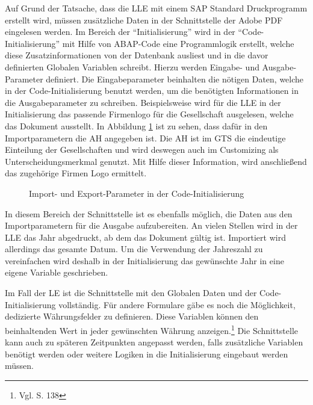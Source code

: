 Auf Grund der Tatsache, dass die \ac{LLE} mit einem SAP Standard Druckprogramm erstellt wird, müssen zusätzliche Daten in der Schnittstelle der Adobe \ac{PDF} eingelesen werden. Im Bereich der "`Initialisierung"' wird in der "`Code-Initialisierung"' mit Hilfe von \ac{ABAP}-Code eine Programmlogik erstellt, welche diese Zusatzinformationen von der Datenbank ausliest und in die davor definierten Globalen Variablen schreibt. Hierzu werden Eingabe- und Ausgabe-Parameter definiert. Die Eingabeparameter beinhalten die nötigen Daten, welche in der Code-Initialisierung benutzt werden, um die benötigten Informationen in die Ausgabeparameter zu schreiben. Beispielsweise wird für die \ac{LLE} in der Initialisierung das passende Firmenlogo für die Gesellschaft ausgelesen, welche das Dokument ausstellt. In Abbildung \ref{figCo} ist zu sehen, dass dafür in den Importparametern die \ac{AH} angegeben ist. Die \ac{AH} ist im GTS die eindeutige Einteilung der Gesellschaften und wird deswegen auch im Customizing als Unterscheidungsmerkmal genutzt. Mit Hilfe dieser Information, wird anschließend das zugehörige Firmen Logo ermittelt.

\begin{figure}[ht]
	\centering
	\caption{Import- und Export-Parameter in der Code-Initialisierung}
	\label{figCo}
\end{figure}

In diesem Bereich der Schnittstelle ist es ebenfalls möglich, die Daten aus den Importparametern für die Ausgabe aufzubereiten. An vielen Stellen wird in der \ac{LLE} das Jahr abgedruckt, ab dem das Dokument gültig ist. Importiert wird allerdings das gesamte Datum. Um die Verwendung der Jahreszahl zu vereinfachen wird deshalb in der Initialisierung das gewünschte Jahr in eine eigene Variable geschrieben.

Im Fall der \ac{LE} ist die Schnittstelle mit den Globalen Daten und der Code-Initialisierung vollständig. Für andere Formulare gäbe es noch die Möglichkeit, dedizierte Währungsfelder zu definieren. Diese Variablen können den beinhaltenden Wert in jeder gewünschten Währung anzeigen.\footnote{Vgl. \cite{Hauser.2015} S. 138}
Die Schnittstelle kann auch zu späteren Zeitpunkten angepasst werden, falls zusätzliche Variablen benötigt werden oder weitere Logiken in die Initialisierung eingebaut werden müssen.
\FloatBarrier
